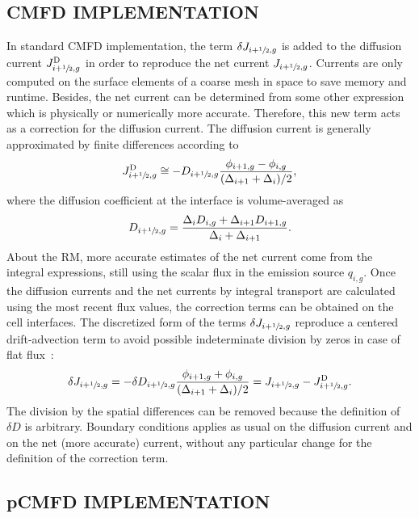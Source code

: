 \documentclass[%
superscriptaddress,
 amsmath,amssymb,
]{revtex4-2}
\newcommand{\jD}{\ensuremath{J^{\textrm{\scriptsize{D}}}}}
\newcommand{\hzi}{\ensuremath{\sfrac{1}{2}}}
\begin{document}
\subsection{CMFD IMPLEMENTATION} 
\label{sec:RM-CMFD}

	In standard CMFD implementation, the term $\delta J_{i+\hzi,g}$ is added to the diffusion current $\jD_{i+\hzi,g}$ in order to reproduce the net current $J_{i+\hzi,g}$. Currents are only computed on the surface elements of a coarse mesh in space to save memory and runtime. Besides, the net current can be determined from some other expression which is physically or numerically more accurate. Therefore, this new term acts as a correction for the diffusion current. The diffusion current is generally approximated by finite differences according to
\begin{equation}
	\label{eq:JD}
	\jD_{i+\hzi,g} \cong - D_{i+\hzi,g}
	\frac{\phi_{i+1,g} - \phi_{i,g}}{(\Delta_{i+1} + \Delta_i)/2},
\end{equation}
where the diffusion coefficient at the interface is volume-averaged as
\begin{equation}
	\label{eq:Ds}
	D_{i+\hzi,g} = \frac{\Delta_i D_{i,g} + \Delta_{i+1} D_{i+1,g}}
	{\Delta_i + \Delta_{i+1}}.
\end{equation}
%
About the RM, more accurate estimates of the net current come from the integral expressions, still using the scalar flux in the emission source $q_{i,g}$. Once the diffusion currents and the net currents by integral transport are calculated using the most recent flux values, the correction terms can be obtained on the cell interfaces. The discretized form of the terms $\delta J_{i+\hzi,g}$ reproduce a centered drift-advection term to avoid possible indeterminate division by zeros in case of flat flux~\cite{Smith-1983,Tomatis-2011}:
\begin{equation}
	\label{eq:dJ}
	\delta J_{i+\hzi,g} = -\delta D_{i+\hzi,g}
	\frac{\phi_{i+1,g} + \phi_{i,g}}{(\Delta_{i+1} + \Delta_i)/2} =
	J_{i+\hzi,g} - \jD_{i+\hzi,g}.
\end{equation}
The division by the spatial differences can be removed because the definition of $\delta D$ is arbitrary. Boundary conditions applies as usual on the diffusion current and on the net (more accurate) current, without any particular change for the definition of the correction term.


\subsection{pCMFD IMPLEMENTATION} 
\label{sec:RM-pCMFD}
\end{document}
